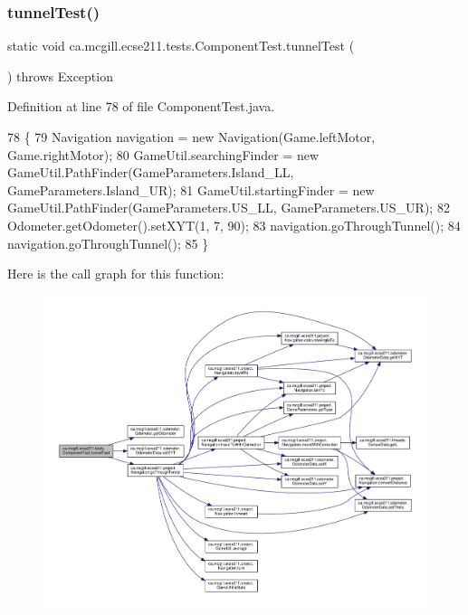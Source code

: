 \subsubsection{\texorpdfstring{tunnel\+Test()}{tunnelTest()}}
{\footnotesize\ttfamily static void ca.\+mcgill.\+ecse211.\+tests.\+Component\+Test.\+tunnel\+Test (\begin{DoxyParamCaption}{ }\end{DoxyParamCaption}) throws Exception\hspace{0.3cm}{\ttfamily [static]}}



Definition at line 78 of file Component\+Test.\+java.


\begin{DoxyCode}
78                                                    \{
79     Navigation navigation = \textcolor{keyword}{new} Navigation(Game.leftMotor, Game.rightMotor);
80     GameUtil.searchingFinder = \textcolor{keyword}{new} GameUtil.PathFinder(GameParameters.Island\_LL, GameParameters.Island\_UR);
81     GameUtil.startingFinder = \textcolor{keyword}{new} GameUtil.PathFinder(GameParameters.US\_LL, GameParameters.US\_UR);
82     Odometer.getOdometer().setXYT(1, 7, 90);
83     navigation.goThroughTunnel();
84     navigation.goThroughTunnel();
85   \}
\end{DoxyCode}
Here is the call graph for this function\+:
\nopagebreak
\begin{figure}[H]
\begin{center}
\leavevmode
\includegraphics[width=350pt]{enumca_1_1mcgill_1_1ecse211_1_1tests_1_1_component_test_ae85caa20c6391bacc4fdbd411ee3f113_cgraph}
\end{center}
\end{figure}
\mbox{\label{enumca_1_1mcgill_1_1ecse211_1_1tests_1_1_component_test_a05cd9d95458b11ed57ca001a28fffa7c}} 
